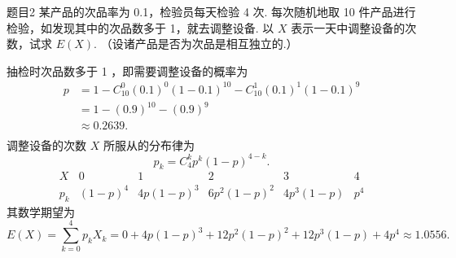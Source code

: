 \begin{question}{题目2}
    某产品的次品率为 0.1，检验员每天检验 4 次. 每次随机地取 10 件产品进行检验，如发现其中的次品数多于 1，就去调整设备. 以 $X$ 表示一天中调整设备的次数，试求 $E(X)$. （设诸产品是否为次品是相互独立的.）
\end{question}
\begin{solution}
    抽检时次品数多于 1 ，即需要调整设备的概率为
    $$
        \begin{aligned}
            p & = 1 - C_{10}^{0}(0.1)^0(1-0.1)^{10} - C_{10}^{1}(0.1)^1(1-0.1)^9 \\
              & = 1 - (0.9)^{10} - (0.9)^9                                       \\
              & \approx 0.2639.                                                  \\
        \end{aligned}
    $$
    调整设备的次数 $X$ 所服从的分布律为
    $$
        p_k = C_4^k p^k (1-p)^{4-k}.
    $$
    $$
        \begin{array}{c|ccccc}
            X   & 0       & 1         & 2           & 3         & 4   \\
            \hline
            p_k & (1-p)^4 & 4p(1-p)^3 & 6p^2(1-p)^2 & 4p^3(1-p) & p^4
        \end{array}
    $$
    其数学期望为
    $$
        E(X) = \sum_{k=0}^{4} p_kX_k
        = 0 + 4p(1-p)^3 + 12p^2(1-p)^2 + 12p^3(1-p) + 4p^4
        \approx 1.0556.
    $$
\end{solution}



